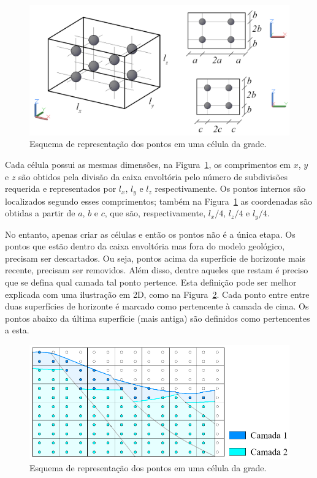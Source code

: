 \begin{figure} [H]
  \begin{center}
    \includegraphics[width=\textwidth]{images/fig-vol-cell}
    \caption{Esquema de representação dos pontos em uma célula da grade.}\label{fig-vol-cell}
  \end{center}
\end{figure}

Cada célula possui as mesmas dimensões, na Figura~\ref{fig-vol-cell}, os comprimentos em $x$, $y$ e $z$ são obtidos pela divisão da caixa envoltória pelo número de subdivisões requerida e representados por $l_x$, $l_y$ e $l_z$ respectivamente. Os pontos internos são localizados segundo esses comprimentos; também na Figura~\ref{fig-vol-cell} as coordenadas são obtidas a partir de $a$, $b$ e $c$, que são, respectivamente, $l_x/4$, $l_z/4$ e $l_y/4$.

No entanto, apenas criar as células e então os pontos não é a única etapa. Os pontos que estão dentro da caixa envoltória mas fora do modelo geológico, precisam ser descartados. Ou seja, pontos acima da superfície de horizonte mais recente, precisam ser removidos. Além disso, dentre aqueles que restam é preciso que se defina qual camada tal ponto pertence. Esta definição pode ser melhor explicada com uma ilustração em 2D, como na Figura~\ref{fig-vol-2d}. Cada ponto entre entre duas superfícies de horizonte é marcado como pertencente à camada de cima. Os pontos abaixo da última superfície (mais antiga) são definidos como pertencentes a esta.

\begin{figure} [H]
  \begin{center}
    \includegraphics[width=\textwidth]{images/fig-vol-2d}
    \caption{Esquema de representação dos pontos em uma célula da grade.}\label{fig-vol-2d}
  \end{center}
\end{figure}

